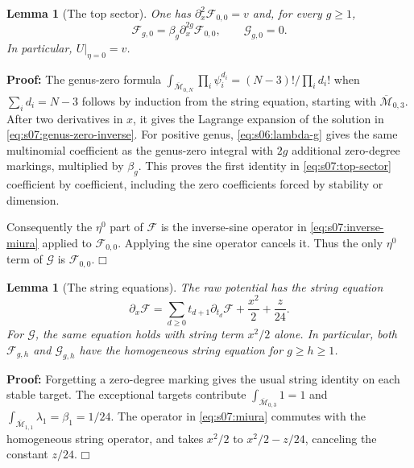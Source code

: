 \documentclass[a4paper,10pt]{article}
\numberwithin{equation}{section}
\newcommand{\MM}{\overline{\mathcal{M}}}
\theoremstyle{paperplain}
\newtheorem{lmm}[thm]{Lemma}
\theoremstyle{paperremark}
\theoremstyle{paperplain}
\newenvironment{prf}{\noindent \textbf{Proof: }}{\hfill $\mdlgwhtsquare$\par\addvspace{0.5\baselineskip}}
\begin{document}
\begin{lmm}[The top sector]\label{lmm:s07:top-sector}
One has $\partial_x^2\mathcal F_{0,0}=v$ and, for every $g\geq1$,
\begin{equation}\label{eq:s07:top-sector}
 \mathcal F_{g,0}=\beta_g\partial_x^{2g}\mathcal F_{0,0},
 \qquad \mathcal G_{g,0}=0.
\end{equation}
In particular, $U|_{\eta=0}=v$.
\end{lmm}
\begin{prf}
The genus-zero formula
$\int_{\MM_{0,N}}\prod_i\psi_i^{d_i}
=(N-3)!/\prod_i d_i!$ when $\sum_i d_i=N-3$ follows by induction
from the string equation, starting with $\MM_{0,3}$.
After two derivatives in $x$, it gives the Lagrange expansion of the
solution in \eqref{eq:s07:genus-zero-inverse}. For positive genus,
\eqref{eq:s06:lambda-g} gives the same multinomial coefficient as
the genus-zero integral with $2g$ additional zero-degree markings,
multiplied by $\beta_g$. This proves the first identity in
\eqref{eq:s07:top-sector} coefficient by coefficient, including the
zero coefficients forced by stability or dimension.

Consequently the $\eta^0$ part of $\mathcal F$ is the inverse-sine
operator in \eqref{eq:s07:inverse-miura} applied to
$\mathcal F_{0,0}$. Applying the sine operator cancels it. Thus the
only $\eta^0$ term of $\mathcal G$ is $\mathcal F_{0,0}$.
\end{prf}

\begin{lmm}[The string equations]\label{lmm:s07:string}
The raw potential has the string equation
\begin{equation}\label{eq:s07:string}
 \partial_x\mathcal F
 =\sum_{d\geq0}t_{d+1}\partial_{t_d}\mathcal F
                 +\frac{x^2}{2}+\frac z{24}.
\end{equation}
For $\mathcal G$, the same equation holds with string term $x^2/2$
alone. In particular, both $\mathcal F_{g,h}$ and $\mathcal G_{g,h}$
have the homogeneous string equation for $g\geq h\geq1$.
\end{lmm}
\begin{prf}
Forgetting a zero-degree marking gives the usual string
identity on each stable target. The exceptional targets contribute
$\int_{\MM_{0,3}}1=1$ and
$\int_{\MM_{1,1}}\lambda_1=\beta_1=1/24$.
The operator in \eqref{eq:s07:miura} commutes with the homogeneous
string operator, and takes $x^2/2$ to $x^2/2-z/24$, canceling the
constant $z/24$.
\end{prf}
\end{document}
